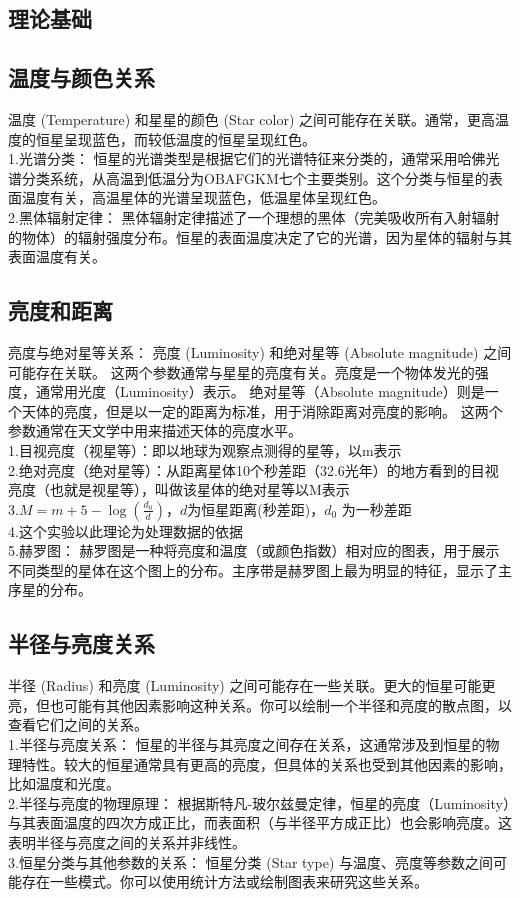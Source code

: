 \documentclass[12pt, a4paper, oneside]{article}
\begin{document}
\begin{spacing}{2.0}
\section{理论基础}
\subsection{温度与颜色关系} 
温度 (Temperature) 和星星的颜色 (Star color) 之间可能存在关联。通常，更高温度的恒星呈现蓝色，而较低温度的恒星呈现红色。\\
1.光谱分类： 恒星的光谱类型是根据它们的光谱特征来分类的，通常采用哈佛光谱分类系统，从高温到低温分为OBAFGKM七个主要类别。这个分类与恒星的表面温度有关，高温星体的光谱呈现蓝色，低温星体呈现红色。\\
2.黑体辐射定律： 黑体辐射定律描述了一个理想的黑体（完美吸收所有入射辐射的物体）的辐射强度分布。恒星的表面温度决定了它的光谱，因为星体的辐射与其表面温度有关。
\subsection{亮度和距离} 
亮度与绝对星等关系： 亮度 (Luminosity) 和绝对星等 (Absolute magnitude) 之间可能存在关联。
这两个参数通常与星星的亮度有关。亮度是一个物体发光的强度，通常用光度（Luminosity）表示。
绝对星等（Absolute magnitude）则是一个天体的亮度，但是以一定的距离为标准，用于消除距离对亮度的影响。
这两个参数通常在天文学中用来描述天体的亮度水平。\\
1.目视亮度（视星等）：即以地球为观察点测得的星等，以m表示\\
2.绝对亮度（绝对星等）：从距离星体10个秒差距（32.6光年）的地方看到的目视亮度（也就是视星等），叫做该星体的绝对星等以M表示\\
3.$M=m+5-\log\left(\frac{d_0}{d}\right)$，$d$为恒星距离(秒差距)，$d_0$ 为一秒差距\\
4.这个实验以此理论为处理数据的依据\\
5.赫罗图： 赫罗图是一种将亮度和温度（或颜色指数）相对应的图表，用于展示不同类型的星体在这个图上的分布。主序带是赫罗图上最为明显的特征，显示了主序星的分布。
\subsection{半径与亮度关系}
半径 (Radius) 和亮度 (Luminosity) 之间可能存在一些关联。更大的恒星可能更亮，但也可能有其他因素影响这种关系。你可以绘制一个半径和亮度的散点图，以查看它们之间的关系。\\
1.半径与亮度关系： 恒星的半径与其亮度之间存在关系，这通常涉及到恒星的物理特性。较大的恒星通常具有更高的亮度，但具体的关系也受到其他因素的影响，比如温度和光度。\\
2.半径与亮度的物理原理： 根据斯特凡-玻尔兹曼定律，恒星的亮度（Luminosity）与其表面温度的四次方成正比，而表面积（与半径平方成正比）也会影响亮度。这表明半径与亮度之间的关系并非线性。\\
3.恒星分类与其他参数的关系： 恒星分类 (Star type) 与温度、亮度等参数之间可能存在一些模式。你可以使用统计方法或绘制图表来研究这些关系。

\end{spacing}
\end{document}
